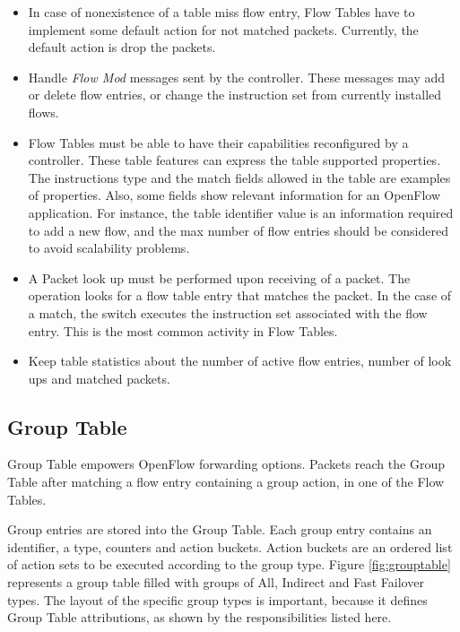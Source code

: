 	\begin{itemize}

    \item In case of nonexistence of a table miss flow entry, Flow Tables have to implement some default action for not matched packets. Currently, the default action is drop the packets. 

	\item Handle \textit{Flow Mod} messages sent by the controller. These messages may add or delete flow entries, or change the instruction set from currently installed flows.  

	\item Flow Tables must be able to have their capabilities reconfigured by a controller. These table features can express the table supported properties. The instructions type and the match fields allowed in the table are examples of properties. Also, some fields show relevant information for an OpenFlow application. For instance, the table identifier value is an information required to add a new flow, and the max number of flow entries should be considered to avoid scalability problems.           

    \item A Packet look up must be performed upon receiving of a packet. The operation looks for a flow table entry that matches the packet. In the case of a match, the switch executes the instruction set associated with the flow entry. This is the most common activity in Flow Tables.   
    
    \item Keep table statistics about the number of active flow entries, number of look ups and matched packets.  

	\end{itemize}

	\subsection{Group Table}

	Group Table empowers OpenFlow forwarding options. Packets reach the Group Table after matching a flow entry containing a group action, in one of the Flow Tables. 
	
	Group entries are stored into the Group Table. Each group entry contains an identifier, a type, counters and action buckets. Action buckets are an ordered list of action sets to be executed according to the group type. Figure \ref{fig:grouptable} represents a group table filled with groups of All, Indirect and Fast Failover types. The layout of the specific group types is important, because it defines Group Table attributions, as shown by the responsibilities listed here.
	

